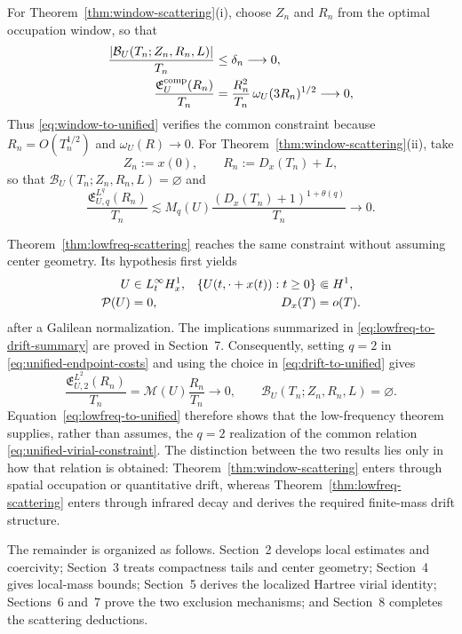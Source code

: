 \documentclass[preprint,12pt]{elsarticle}
\numberwithin{equation}{section}
\theoremstyle{remark}
\newcommand{\Mcal}{\mathcal M}
\newcommand{\Pcal}{\mathcal P}
\begin{document}
For Theorem~\ref{thm:window-scattering}\textup{(i)}, choose $Z_n$ and $R_n$ from the optimal occupation window, so that
\begin{align}\label{eq:window-to-unified}
  \frac{|\mathcal B_U(T_n;Z_n,R_n,L)|}{T_n}
  &\le\delta_n\longrightarrow0,\\
  \frac{\mathfrak E_U^{\rm comp}(R_n)}{T_n}
  &=\frac{R_n^2}{T_n}\,\omega_U(3R_n)^{1/2}
  \longrightarrow0,\notag
\end{align}
Thus \eqref{eq:window-to-unified} verifies the common constraint because $R_n=O(T_n^{1/2})$ and $\omega_U(R)\to0$.  For Theorem~\ref{thm:window-scattering}\textup{(ii)}, take
\begin{equation}\label{eq:drift-to-unified}
  Z_n:=x(0),
  \qquad
  R_n:=D_x(T_n)+L,
\end{equation}
so that $\mathcal B_U(T_n;Z_n,R_n,L)=\varnothing$ and
\[
  \frac{\mathfrak E_{U,q}^{L^q}(R_n)}{T_n}
  \lesssim
  M_q(U)\frac{(D_x(T_n)+1)^{1+\theta(q)}}{T_n}
  \longrightarrow0.
\]

Theorem~\ref{thm:lowfreq-scattering} reaches the same constraint without assuming center geometry.  Its hypothesis first yields
\begin{align}\label{eq:lowfreq-to-drift-summary}
  U&\in L_t^\infty H_x^1,
  &\{U(t,\cdot+x(t)):t\ge0\}&\Subset H^1,\notag\\
  \Pcal(U)&=0,
  &D_x(T)&=o(T).
\end{align}
after a Galilean normalization.  The implications summarized in \eqref{eq:lowfreq-to-drift-summary} are proved in Section~7.  Consequently, setting $q=2$ in \eqref{eq:unified-endpoint-costs} and using the choice in \eqref{eq:drift-to-unified} gives
\begin{equation}\label{eq:lowfreq-to-unified}
  \frac{\mathfrak E_{U,2}^{L^2}(R_n)}{T_n}
  =\Mcal(U)\frac{R_n}{T_n}
  \longrightarrow0,
  \qquad
  \mathcal B_U(T_n;Z_n,R_n,L)=\varnothing.
\end{equation}
Equation~\eqref{eq:lowfreq-to-unified} therefore shows that the low-frequency theorem supplies, rather than assumes, the $q=2$ realization of the common relation \eqref{eq:unified-virial-constraint}.  The distinction between the two results lies only in how that relation is obtained: Theorem~\ref{thm:window-scattering} enters through spatial occupation or quantitative drift, whereas Theorem~\ref{thm:lowfreq-scattering} enters through infrared decay and derives the required finite-mass drift structure.

The remainder is organized as follows. Section~2 develops local estimates and coercivity; Section~3 treats compactness tails and center geometry; Section~4 gives local-mass bounds; Section~5 derives the localized Hartree virial identity; Sections~6 and~7 prove the two exclusion mechanisms; and Section~8 completes the scattering deductions.
\end{document}
